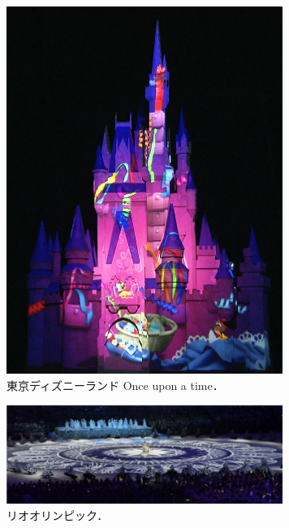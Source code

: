 \begin{figure}[t]
  \centering
  \includegraphics[width=9cm]{image/disney.jpg}
  \caption[東京ディズニーランド Once upon a time]{東京ディズニーランド Once upon a time\cite{disney}．}
\label{disney}
\end{figure}

\begin{figure}[b]
    \centering
    \includegraphics[width=9cm]{image/rio.png}
    \caption[リオオリンピック]{リオオリンピック\cite{rioprojection}．}
  \label{rio}
\end{figure}

\clearpage

